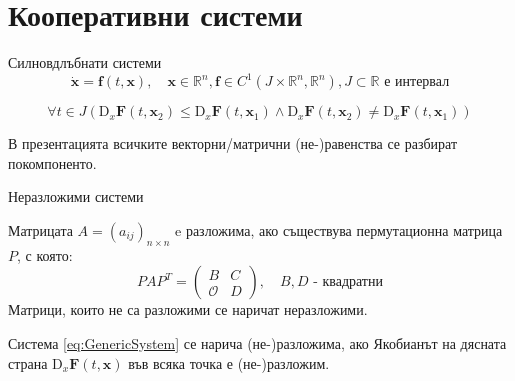 \section{\hspace{1em}Кооперативни системи}
\begin{frame}[t]{Силновдлъбнати системи}
  \begin{equation}
    \label{eq:GenericSystem}
    \dot{\boldsymbol{x}} = \boldsymbol{f}(t, \boldsymbol{x}),  \quad \boldsymbol{x} \in \mathbb{R}^n, \boldsymbol{f} \in C^1(J \times \mathbb{R}^n, \mathbb{R}^n), J \subset \mathbb{R} \text{ е интервал}
    \end{equation}

\begin{definition}

  \begin{equation}
     \forall{t \in J} \left(\mathrm{D}_x\boldsymbol{F}(t, \boldsymbol{x}_2) \leq \mathrm{D}_x\boldsymbol{F}(t, \boldsymbol{x}_1) \wedge \mathrm{D}_x\boldsymbol{F}(t, \boldsymbol{x}_2) \neq \mathrm{D}_x\boldsymbol{F}(t, \boldsymbol{x}_1)\right)
    \end{equation}
  \end{definition}

  \begin{nota-bene}
    В презентацията всичките векторни/матрични (не-)равенства се разбират покомпоненто.
  \end{nota-bene}
\end{frame}

\begin{frame}[t]{Неразложими системи}
  \begin{definition}
    Матрицата $A=(a_{ij})_{n \times n}$ e разложима, ако съществува пермутационна матрица $P$, с която:
    \begin{equation*}
      PAP^T =
      \begin{pmatrix}
        B & C \\
        \mathscr{O} & D
      \end{pmatrix}, \quad B, D \text{ - квадратни}
    \end{equation*}
    Матрици, които не са разложими се наричат неразложими.
  \end{definition}
  \begin{definition}
    Система \eqref{eq:GenericSystem} се нарича (не-)разложима, ако Якобианът на дясната страна $\mathrm{D}_x\boldsymbol{F}(t, \boldsymbol{x})$ във всяка точка е (не-)разложим.
  \end{definition}

\end{frame}

